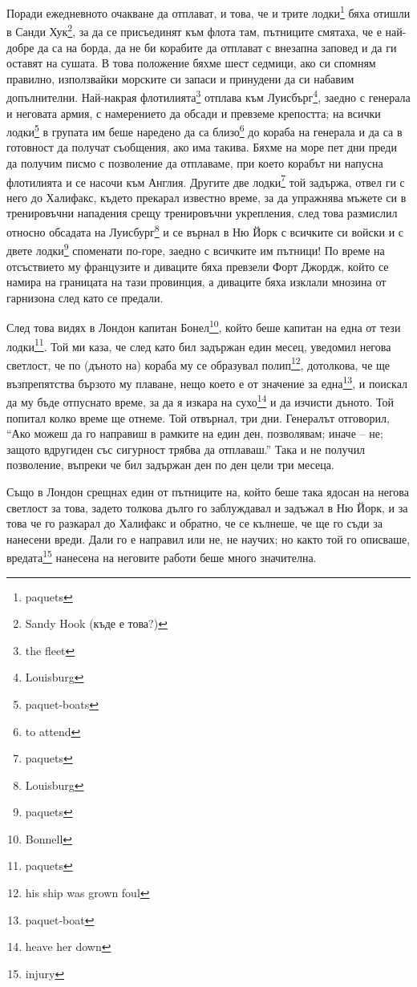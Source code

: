 \documentclass[12pt]{book}
\begin{document}
Поради ежедневното очакване да отплават, и това, че и трите лодки\footnote{paquets} бяха отишли в Санди Хук\footnote{Sandy Hook (къде е това?)}, за да се присъединят към флота там, пътниците смятаха, че е най-добре да са на борда, да не би корабите да отплават с внезапна заповед и да ги оставят на сушата. В това положение бяхме шест седмици, ако си спомням правилно, използвайки морските си запаси и принудени да си набавим допълнителни. Най-накрая флотилията\footnote{the fleet} отплава към Луисбърг\footnote{Louisburg}, заедно с генерала и неговата армия, с намерението да обсади и превземе крепостта; на всички лодки\footnote{paquet-boats} в групата им беше наредено да са близо\footnote{to attend} до кораба на генерала и да са в готовност да получат съобщения, ако има такива. Бяхме на море пет дни преди да получим писмо с позволение да отплаваме, при което корабът ни напусна флотилията и се насочи към Англия. Другите две лодки\footnote{paquets} той задържа, отвел ги с него до Халифакс, където прекарал известно време, за да упражнява мъжете си в тренировъчни нападения срещу тренировъчни укрепления, след това размислил относно обсадата на Луисбург\footnote{Louisburg} и се върнал в Ню Йорк с всичките си войски и с двете лодки\footnote{paquets} споменати по-горе, заедно с всичките им пътници! По време на отсъствието му французите и диваците бяха превзели Форт Джордж, който се намира на границата на тази провинция, а диваците бяха изклали мнозина от гарнизона след като се предали. 

След това видях в Лондон капитан Бонел\footnote{Bonnell}, който беше капитан на една от тези лодки\footnote{paquets}. Той ми каза, че след като бил задържан един месец, уведомил негова светлост, че по (дъното на) кораба му се образувал полип\footnote{his ship was grown foul}, дотолкова, че ще възпрепятства бързото му плаване, нещо което е от значение за една\footnote{paquet-boat}, и поискал да му бъде отпуснато време, за да я изкара на сухо\footnote{heave her down} и да изчисти дъното. Той попитал колко време ще отнеме. Той отвърнал, три дни. Генералът отговорил, “Ако можеш да го направиш в рамките на един ден, позволявам; иначе – не; защото вдругиден със сигурност трябва да отплаваш.” Така и не получил позволение, въпреки че бил задържан ден по ден цели три месеца. 

Също в Лондон срещнах един от пътниците на, който беше така ядосан на негова светлост за това, задето толкова дълго го заблуждавал и задъжал в Ню Йорк, и за това че го разкарал до Халифакс и обратно, че се кълнеше, че ще го съди за нанесени вреди. Дали го е направил или не, не научих; но както той го описваше, вредата\footnote{injury} нанесена на неговите работи беше много значителна.
\end{document}

